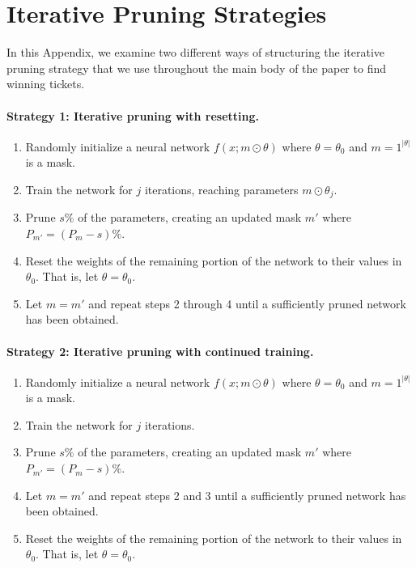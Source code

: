 \section{Iterative Pruning Strategies}

In this Appendix, we examine two different ways of structuring the iterative pruning strategy that we use
throughout the main body of the paper to find winning tickets.

\paragraph{Strategy 1: Iterative pruning with resetting.}

\begin{enumerate}
\item Randomly initialize a neural network $f(x; m \odot \theta)$ where $\theta = \theta_0$ and $m = 1^{|\theta|}$ is a mask.
\item Train the network for $j$ iterations, reaching parameters $m \odot \theta_j$.
\item Prune $s\%$ of the parameters, creating an updated mask $m'$ where $P_{m'} = (P_m - s)\%$.
\item Reset the weights of the remaining portion of the network to their values in $\theta_0$. That is, let $\theta = \theta_0$.
\item Let $m = m'$ and repeat steps 2 through 4 until a sufficiently pruned network has been obtained.
\end{enumerate}

\paragraph{Strategy 2: Iterative pruning with continued training.}

\begin{enumerate}
\item Randomly initialize a neural network $f(x; m \odot \theta)$ where $\theta = \theta_0$ and $m = 1^{|\theta|}$ is a mask.
\item Train the network for $j$ iterations.
\item Prune $s\%$ of the parameters, creating an updated mask $m'$ where $P_{m'} = (P_m - s)\%$.
\item Let $m=m'$ and repeat steps 2 and 3 until a sufficiently pruned network has been obtained.
\item Reset the weights of the remaining portion of the network to their values in $\theta_0$. That is, let $\theta = \theta_0$.
\end{enumerate}

